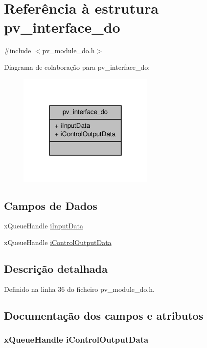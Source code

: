 \hypertarget{structpv__interface__do}{\section{Referência à estrutura pv\-\_\-interface\-\_\-do}
\label{structpv__interface__do}
}


{\ttfamily \#include $<$pv\-\_\-module\-\_\-do.\-h$>$}



Diagrama de colaboração para pv\-\_\-interface\-\_\-do\-:
\nopagebreak
\begin{figure}[H]
\begin{center}
\leavevmode
\includegraphics[width=190pt]{structpv__interface__do__coll__graph}
\end{center}
\end{figure}
\subsection*{Campos de Dados}
\begin{DoxyCompactItemize}
\item 
x\-Queue\-Handle \hyperlink{structpv__interface__do_ad057767ef15274f0933ad1821fea7239}{i\-Input\-Data}
\item 
x\-Queue\-Handle \hyperlink{structpv__interface__do_a47359dc53fe6c9e48eae67c40f5bde8a}{i\-Control\-Output\-Data}
\end{DoxyCompactItemize}


\subsection{Descrição detalhada}


Definido na linha 36 do ficheiro pv\-\_\-module\-\_\-do.\-h.



\subsection{Documentação dos campos e atributos}
\hypertarget{structpv__interface__do_a47359dc53fe6c9e48eae67c40f5bde8a}{
\subsubsection[{i\-Control\-Output\-Data}]{\setlength{\rightskip}{0pt plus 5cm}x\-Queue\-Handle i\-Control\-Output\-Data}}\label{structpv__interface__do_a47359dc53fe6c9e48eae67c40f5bde8a}


